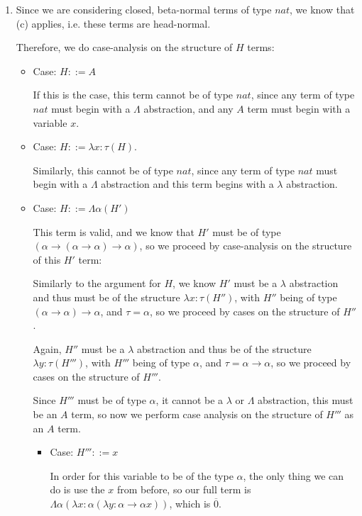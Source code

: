 \documentclass[12pt]{article}
\begin{document}
\begin{enumerate}[label=(\alph*)]
  \item
    Since we are considering closed, beta-normal terms of type $nat$, we know that (c) applies, i.e. these terms are head-normal.

    Therefore, we do case-analysis on the structure of $H$ terms:

    \begin{itemize}
      \item
        Case: $H ::= A$

        If this is the case, this term cannot be of type $nat$, since any term of type $nat$ must begin with a $\Lambda$ abstraction, and any $A$ term must begin with a variable $x$.

      \item
        Case: $H ::= \lambda x: \tau(H)$.

        Similarly, this cannot be of type $nat$, since any term of type $nat$ must begin with a $\Lambda$ abstraction and this term begins with a $\lambda$ abstraction.

      \item
        Case: $H ::= \Lambda \alpha(H')$

        This term is valid, and we know that $H'$ must be of type $(\alpha \rightarrow (\alpha \rightarrow \alpha) \rightarrow \alpha)$, so we proceed by case-analysis on the structure of this $H'$ term:

        Similarly to the argument for $H$, we know $H'$ must be a $\lambda$ abstraction and thus must be of the structure $\lambda x: \tau(H'')$, with $H''$ being of type $(\alpha \rightarrow \alpha) \rightarrow \alpha$, and $\tau=\alpha$, so we proceed by cases on the structure of $H''$.

        Again, $H''$ must be a $\lambda$ abstraction and thus be of the structure $\lambda y: \tau(H''')$, with $H'''$ being of type $\alpha$, and $\tau = \alpha \rightarrow \alpha$, so we proceed by cases on the structure of $H'''$.

        Since $H'''$ must be of type $\alpha$, it cannot be a $\lambda$ or $\Lambda$ abstraction, this must be an $A$ term, so now we perform case analysis on the structure of $H'''$ as an $A$ term.

        \begin{itemize}
          \item
            Case: $H''' ::= x$

            In order for this variable to be of the type $\alpha$, the only thing we can do is use the $x$ from before, so our full term is $\Lambda \alpha(\lambda x:\alpha(\lambda y:\alpha \rightarrow \alpha x))$, which is $\overline{0}$.


\end{itemize}
\end{itemize}
\end{enumerate}
\end{document}
